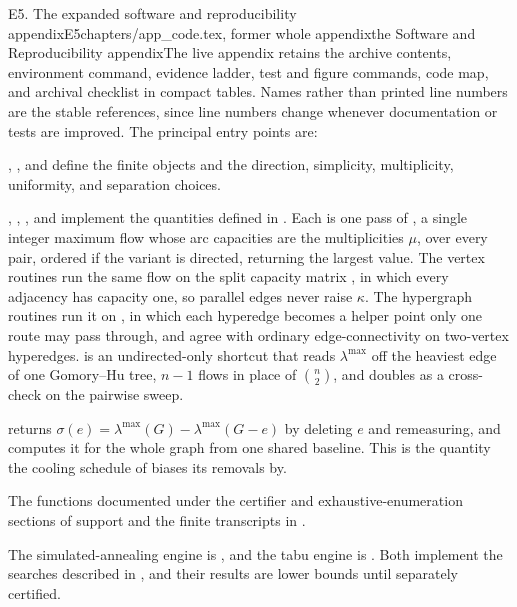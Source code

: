 \begin{offcut}{E5. The expanded software and reproducibility appendix}{E5}{chapters/app\_code.tex, former whole appendix}{the Software and Reproducibility appendix}{The live appendix retains the archive contents, environment command, evidence ladder, test and figure commands, code map, and archival checklist in compact tables.}
Names rather than printed line numbers are the stable references, since line numbers change whenever documentation or tests are improved. The principal entry points are:

\begin{description}[style=nextline]
  \item[Graph and hypergraph objects]
  , , and  define the finite objects and the direction, simplicity, multiplicity, uniformity, and separation choices.

  \item[Exact measurement]
  , , , and  implement the quantities defined in . Each is one pass of , a single  integer maximum flow whose arc capacities are the multiplicities $\mu$, over every pair, ordered if the variant is directed, returning the largest value. The vertex routines run the same flow on the split capacity matrix , in which every adjacency has capacity one, so parallel edges never raise $\kappa$. The hypergraph routines run it on , in which each hyperedge becomes a helper point only one route may pass through, and agree with ordinary edge-connectivity on two-vertex hyperedges.  is an undirected-only shortcut that reads $\lambda^{\max}$ off the heaviest edge of one Gomory--Hu tree, $n-1$ flows in place of $\binom{n}{2}$, and doubles as a cross-check on the pairwise sweep.

  \item[Search instrumentation]
   returns $\sigma(e) = \lambda^{\max}(G) - \lambda^{\max}(G-e)$ by deleting $e$ and remeasuring, and  computes it for the whole graph from one shared baseline. This is the quantity the cooling schedule of  biases its removals by.

  \item[Certification and enumeration]
  The functions documented under the certifier and exhaustive-enumeration sections of  support  and the finite transcripts in .

  \item[Discovery]
  The simulated-annealing engine is , and the tabu engine is . Both implement the searches described in , and their results are lower bounds until separately certified.


\end{description}
\end{offcut}
